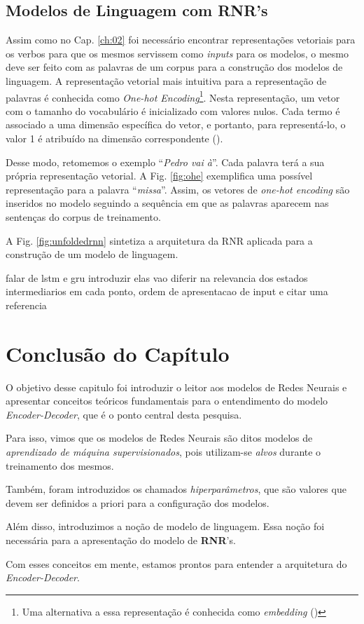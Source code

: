 \subsection{Modelos de Linguagem com RNR's}

Assim como no Cap. \ref{ch:02} foi necessário encontrar representações vetoriais para os verbos para que os mesmos servissem como \textit{inputs} para os modelos, o mesmo deve ser feito com as palavras de um corpus para a construção dos modelos de linguagem. A representação vetorial mais intuitiva para a representação de palavras é conhecida como \textit{One-hot Encoding}\footnote{Uma alternativa a essa representação é conhecida como \textit{embedding} (\cite{word2vec:2013})}. Nesta representação, um vetor com o tamanho do vocabulário é inicializado com valores nulos. Cada termo é associado a uma dimensão específica do vetor, e portanto, para representá-lo, o valor 1 é atribuído na dimensão correspondente (\cite{harris:2013}). 

Desse modo, retomemos o exemplo “\textit{Pedro vai à}”. Cada palavra terá a sua própria representação vetorial. A Fig. \ref{fig:ohe} exemplifica uma possível representação para a palavra “\textit{missa}”. Assim, os vetores de \textit{one-hot encoding} são inseridos no modelo seguindo a sequência em que as palavras aparecem nas sentenças do corpus de treinamento. 



A Fig. \ref{fig:unfoldedrnn} sintetiza a arquitetura da RNR aplicada para a construção de um modelo de linguagem.



falar de lstm e gru introduzir elas
vao diferir na relevancia dos estados intermediarios em cada ponto, ordem de apresentacao de input e citar uma referencia

\section{Conclusão do Capítulo}

O objetivo desse capitulo foi introduzir o leitor aos modelos de Redes Neurais e apresentar conceitos teóricos fundamentais para o entendimento do modelo \textit{Encoder-Decoder}, que é o ponto central desta pesquisa.

Para isso, vimos que os modelos de Redes Neurais são ditos modelos de \textit{aprendizado de máquina supervisionados}, pois utilizam-se \textit{alvos} durante o treinamento dos mesmos.

Também, foram introduzidos os chamados \textit{hiperparâmetros}, que são valores que devem ser definidos a priori para a configuração dos modelos. 

Além disso, introduzimos a noção de modelo de linguagem. Essa noção foi necessária para a apresentação do modelo de \textbf{RNR}'s. 

Com esses conceitos em mente, estamos prontos para entender a arquitetura do \textit{Encoder-Decoder}.

